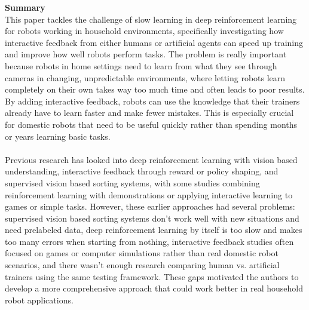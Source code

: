 \documentclass[report.tex]{subfiles}
\begin{document}
\noindent\textbf{Summary} \\
This paper tackles the challenge of slow learning in deep reinforcement learning for robots working in household environments, specifically investigating how interactive feedback from either humans or artificial agents can speed up training and improve how well robots perform tasks. The problem is really important because robots in home settings need to learn from what they see through cameras in changing, unpredictable environments, where letting robots learn completely on their own takes way too much time and often leads to poor results. By adding interactive feedback, robots can use the knowledge that their trainers already have to learn faster and make fewer mistakes. This is especially crucial for domestic robots that need to be useful quickly rather than spending months or years learning basic tasks.\\\\
Previous research has looked into deep reinforcement learning with vision based understanding, interactive feedback through reward or policy shaping, and supervised vision based sorting systems, with some studies combining reinforcement learning with demonstrations or applying interactive learning to games or simple tasks. However, these earlier approaches had several problems: supervised vision based sorting systems don't work well with new situations and need prelabeled data, deep reinforcement learning by itself is too slow and makes too many errors when starting from nothing, interactive feedback studies often focused on games or computer simulations rather than real domestic robot scenarios, and there wasn't enough research comparing human vs. artificial trainers using the same testing framework. These gaps motivated the authors to develop a more comprehensive approach that could work better in real household robot applications.
\end{document}

